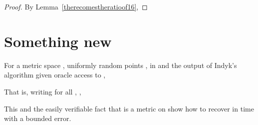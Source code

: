 \documentclass[letterpaper,12pt]{article}
\newcommand{\comment}[1]{}
\begin{document}
{{\begin{proof}
\comment{Equivalently,

}By Lemma~\ref{therecomestheratioof16},

\end{proof}

\section{Something new}

For
a metric space
,
uniformly random points
, 
in  and
the output  of
Indyk's algorithm given oracle access to ,

That is,
writing
 for all , ,

This and the easily verifiable fact that  is a metric on 
show how to recover  in  time with a bounded  error.
}}



\noindent
\end{document}
